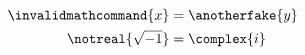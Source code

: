 \documentclass{article}
\begin{document}
\begin{align}
\invalidmathcommand{x} &= \anotherfake{y} \\
\notreal{\sqrt{-1}} &= \complex{i}
\end{align}
\end{document}
